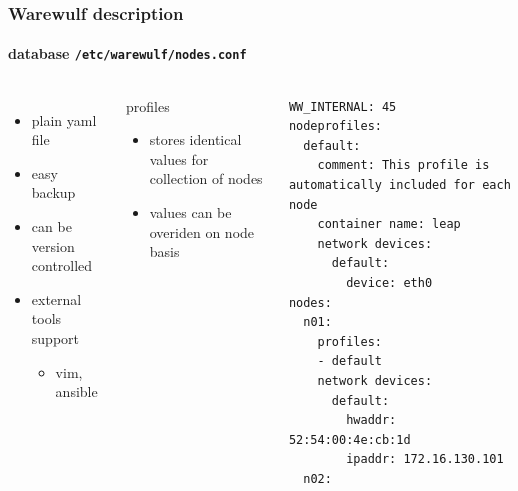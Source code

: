 \documentclass[aspectratio=169]{beamer}
\begin{document}
\begin{frame}[fragile]
\frametitle{Warewulf description}
\framesubtitle{database \texttt{/etc/warewulf/nodes.conf}}
\begin{columns}
%
\begin{itemize}
\item plain yaml file
  \item easy backup
  \item can be version controlled
  \item external tools support
  \begin{itemize}
    \item vim, ansible
  \end{itemize}
\end{itemize}
\begin{block}{profiles}
\begin{itemize}
  \item stores identical values for collection of nodes
  \item values can be overiden on node basis
\end{itemize}
\end{block}
\begin{lstlisting}[style=yaml]
WW_INTERNAL: 45
nodeprofiles:
  default:
    comment: This profile is automatically included for each node
    container name: leap
    network devices:
      default:
        device: eth0
nodes:
  n01:
    profiles:
    - default
    network devices:
      default:
        hwaddr: 52:54:00:4e:cb:1d
        ipaddr: 172.16.130.101
  n02:
\end{lstlisting}
%
\end{columns}
\end{frame}
\end{document}
